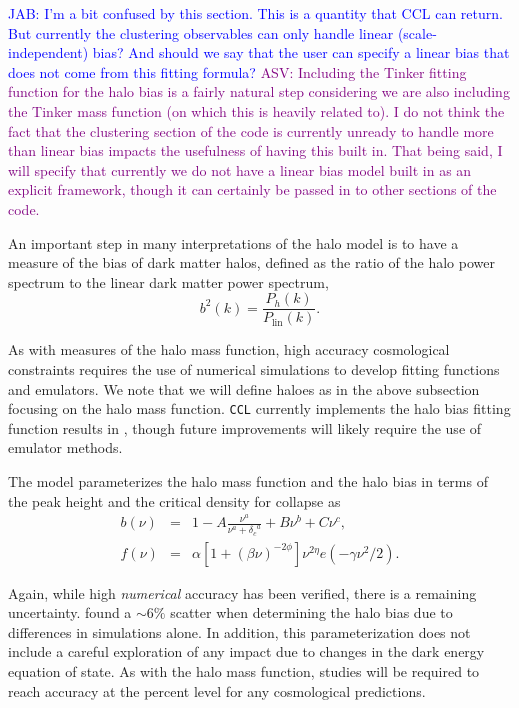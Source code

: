 \documentclass[\docopts]{\docclass}
\newcommand{\asv}[1]{\textcolor{purple}{ASV: #1}}
\newcommand{\jab}[1]{\textcolor{blue}{JAB: #1}}
\begin{document}
\jab{I'm a bit confused by this section. This is a quantity that CCL can return. But currently the clustering observables can only handle linear (scale-independent) bias? And should we say that the user can specify a linear bias that does not come from this fitting formula?}
\asv{Including the Tinker fitting function for the halo bias is a fairly natural step considering we are also including the Tinker mass function (on which this is heavily related to). I do not think the fact that the clustering section of the code is currently unready to handle more than linear bias impacts the usefulness of having this built in. That being said, I will specify that currently we do not have a linear bias model built in as an explicit framework, though it can certainly be passed in to other sections of the code.}

An important step in many interpretations of the halo model is to have a measure of the bias of dark matter halos, defined as the ratio of the halo power spectrum to the linear dark matter power spectrum,
\begin{equation}
  b^2(k) = \frac{P_h(k)}{P_{\mathrm{lin}}(k)}.
  \label{eq:halo_bias}
\end{equation}

As with measures of the halo mass function, high accuracy cosmological constraints requires the use of numerical simulations to develop fitting functions and emulators. We note that we will define haloes as in the above subsection focusing on the halo mass function. {\tt CCL} currently implements the halo bias fitting function results in \citet{Tinker2010}, though future improvements will likely require the use of emulator methods.

The \citet{Tinker2010} model parameterizes the halo mass function and the halo bias in terms of the peak height and the critical density for collapse as
\begin{eqnarray}
  b(\nu) &=& 1 - A\frac{\nu^a}{\nu^a + {\delta_c}^a} + B\nu^b+C\nu^c,\\
  f(\nu) &=& \alpha[1+(\beta\nu)^{-2\phi}]\nu^{2\eta}e(-\gamma\nu^2/2).
\end{eqnarray}

Again, while high {\em numerical} accuracy has been verified, there is a remaining uncertainty. \citet{Tinker2010} found a $\sim6\%$ scatter when determining the halo bias due to differences in simulations alone. In addition, this parameterization does not include a careful exploration of any impact due to changes in the dark energy equation of state. As with the halo mass function, studies will be required to reach accuracy at the percent level for any cosmological predictions. 
\end{document}

